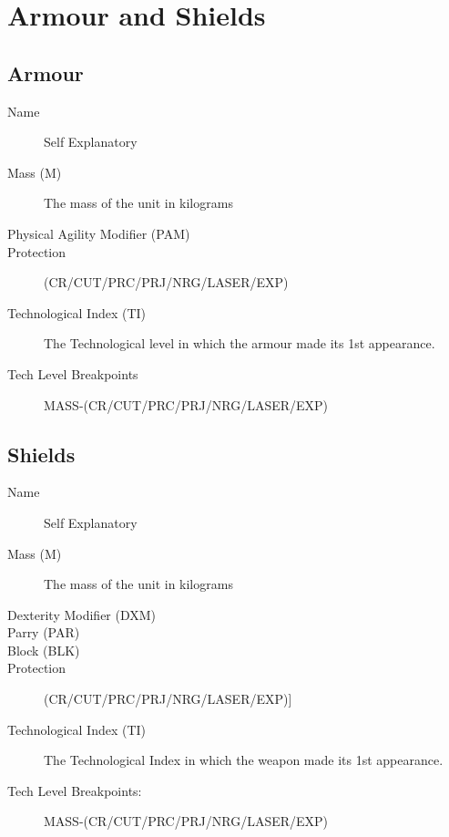 \chapter{Armour and Shields}

\section{Armour}

\begin{description}
	\item[Name]
	Self Explanatory
	\item[Mass (M)]
	The mass of the unit in kilograms
	\item[Physical Agility Modifier (PAM)]
	\item[Protection]
	(CR/CUT/PRC/PRJ/NRG/LASER/EXP)
	\item[Technological Index (TI)]
	The Technological level in which the armour made its 1st appearance.
	\item[Tech Level Breakpoints]
	MASS-(CR/CUT/PRC/PRJ/NRG/LASER/EXP)
\end{description}

\clearpage

\section{Shields}

\begin{description}
	\item[Name]
	Self Explanatory
	\item[Mass (M)]
	The mass of the unit in kilograms
	\item[Dexterity Modifier (DXM)]
	\item[Parry (PAR)]
	\item[Block (BLK)]
	\item[Protection]
	(CR/CUT/PRC/PRJ/NRG/LASER/EXP)]
	\item[Technological Index (TI)]
	The Technological Index in which the weapon made its 1st appearance.
	\item[Tech Level Breakpoints:]
	MASS-(CR/CUT/PRC/PRJ/NRG/LASER/EXP)
\end{description}


